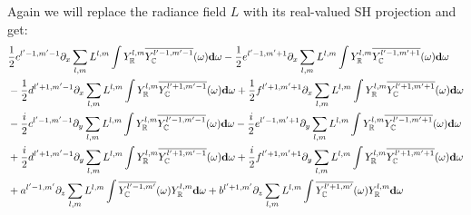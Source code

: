 \documentclass[10pt]{scrartcl}
\begin{document}
Again we will replace the radiance field $L$ with its real-valued SH projection and get:
\begin{align*}
&
\frac{1}{2}c^{{l'-1,m'-1}}\partial_x\sum_{l,m}L^{l,m}\int{Y_{\mathbb{R}}^{l,m}\overline{Y_{\mathbb{C}}^{l'-1, m'-1}}(\omega )\mathbf{d}\omega}
-\frac{1}{2}e^{{l'-1,m'+1}}\partial_x\sum_{l,m}L^{l,m}\int{Y_{\mathbb{R}}^{l,m}\overline{Y_{\mathbb{C}}^{l'-1, m'+1}}(\omega )\mathbf{d}\omega}
\\&
-\frac{1}{2}d^{{l'+1,m'-1}}\partial_x\sum_{l,m}L^{l,m}\int{Y_{\mathbb{R}}^{l,m}\overline{Y_{\mathbb{C}}^{l'+1, m'-1}}(\omega )\mathbf{d}\omega}
+\frac{1}{2}f^{{l'+1,m'+1}}\partial_x\sum_{l,m}L^{l,m}\int{Y_{\mathbb{R}}^{l,m}\overline{Y_{\mathbb{C}}^{l'+1, m'+1}}(\omega )\mathbf{d}\omega}
\\&
-\frac{i}{2}c^{{l'-1,m'-1}}\partial_y\sum_{l,m}L^{l,m}\int{Y_{\mathbb{R}}^{l,m}\overline{Y_{\mathbb{C}}^{l'-1, m'-1}}(\omega )\mathbf{d}\omega}
-\frac{i}{2}e^{{l'-1,m'+1}}\partial_y\sum_{l,m}L^{l,m}\int{Y_{\mathbb{R}}^{l,m}\overline{Y_{\mathbb{C}}^{l'-1, m'+1}}(\omega )\mathbf{d}\omega}
\\&
+\frac{i}{2}d^{{l'+1,m'-1}}\partial_y\sum_{l,m}L^{l,m}\int{Y_{\mathbb{R}}^{l,m}\overline{Y_{\mathbb{C}}^{l'+1, m'-1}}(\omega )\mathbf{d}\omega}
+\frac{i}{2}f^{{l'+1,m'+1}}\partial_y\sum_{l,m}L^{l,m}\int{Y_{\mathbb{R}}^{l,m}\overline{Y_{\mathbb{C}}^{l'+1, m'+1}}(\omega )\mathbf{d}\omega}
\\&
+a^{{l'-1,m'}}\partial_z\sum_{l,m}L^{l,m}\int{\overline{Y_{\mathbb{C}}^{l'-1, m'}}(\omega )Y_{\mathbb{R}}^{l,m}\mathbf{d}\omega}
+b^{{l'+1,m'}}\partial_z\sum_{l,m}L^{l,m}\int{\overline{Y_{\mathbb{C}}^{l'+1, m'}}(\omega )Y_{\mathbb{R}}^{l,m}\mathbf{d}\omega}
\end{align*}
\end{document}

